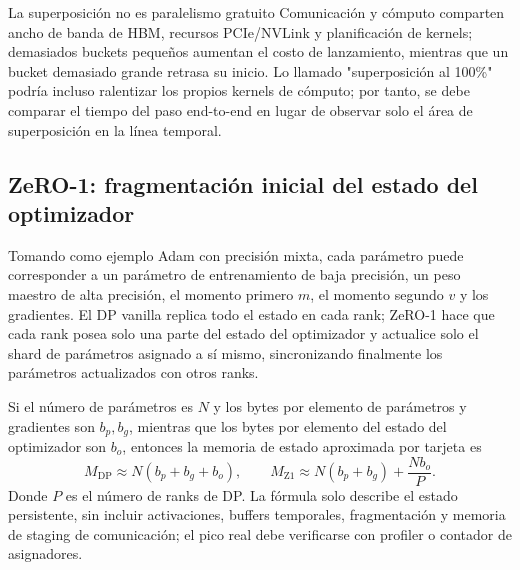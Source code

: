
\begin{warningbox}{La superposición no es paralelismo gratuito}
Comunicación y cómputo comparten ancho de banda de HBM, recursos PCIe/NVLink y planificación de kernels; demasiados buckets pequeños aumentan el costo de lanzamiento, mientras que un bucket demasiado grande retrasa su inicio. Lo llamado "superposición al 100\%" podría incluso ralentizar los propios kernels de cómputo; por tanto, se debe comparar el tiempo del paso end-to-end en lugar de observar solo el área de superposición en la línea temporal.
\end{warningbox}

\subsection{ZeRO-1: fragmentación inicial del estado del optimizador}

Tomando como ejemplo Adam con precisión mixta, cada parámetro puede corresponder a un parámetro de entrenamiento de baja precisión, un peso maestro de alta precisión, el momento primero $m$, el momento segundo $v$ y los gradientes. El DP vanilla replica todo el estado en cada rank; ZeRO-1 hace que cada rank posea solo una parte del estado del optimizador y actualice solo el shard de parámetros asignado a sí mismo, sincronizando finalmente los parámetros actualizados con otros ranks.


Si el número de parámetros es $N$ y los bytes por elemento de parámetros y gradientes son $b_p,b_g$, mientras que los bytes por elemento del estado del optimizador son $b_o$, entonces la memoria de estado aproximada por tarjeta es
\[
M_{\mathrm{DP}}\approx N(b_p+b_g+b_o),
\qquad
M_{\mathrm{Z1}}\approx N(b_p+b_g)+\frac{Nb_o}{P}.
\]
Donde $P$ es el número de ranks de DP. La fórmula solo describe el estado persistente, sin incluir activaciones, buffers temporales, fragmentación y memoria de staging de comunicación; el pico real debe verificarse con profiler o contador de asignadores.


